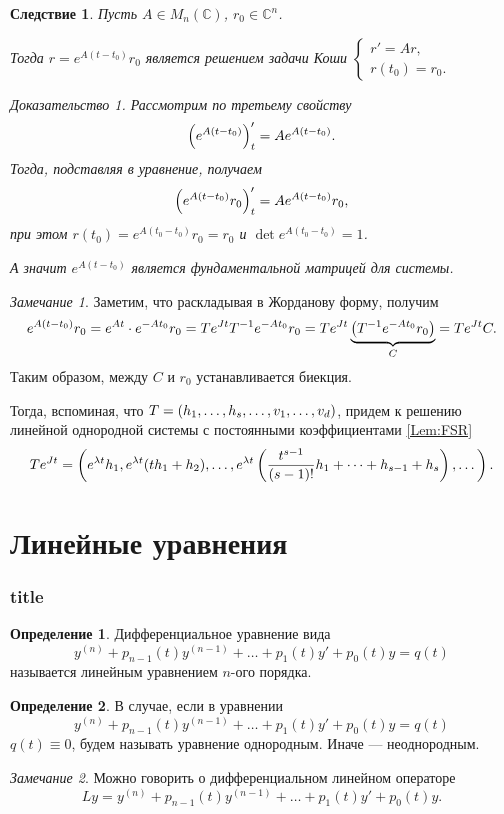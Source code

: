 \documentclass[a5paper, 10pt]{article}
\theoremstyle{definition}
\newtheorem{Def}{Определение}
\theoremstyle{plain}
\newtheorem{Cor}{Следствие}
\theoremstyle{remark}
\newtheorem*{Note}{Замечание}
\newtheorem*{Proof}{Доказательство}
\begin{document}
		\begin{Cor}
			Пусть $A \in M_n (\mathbb{C})$, $r_0 \in \mathbb{C}^n$. 
			
			Тогда $r= e^{A(t-t_0)} r_0$ является решением задачи Коши $\begin{cases}r'=Ar,\\ r(t_0) = r_0.\end{cases}$
			
			\begin{Proof}
				Рассмотрим по третьему свойству
				\[
				\left(e^{A(t-t_0)}\right)_t' = A e^{A(t-t_0)}.
				\]
				Тогда, подставляя в уравнение, получаем
				\[
				\left(e^{A(t-t_0)}r_0\right)_t' = A e^{A(t-t_0)}r_0,
				\]
				при этом $r(t_0) = e^{A(t_0-t_0)} r_0 = r_0$ и $\det e^{A(t_0-t_0)} = 1$.
				
				А значит $e^{A(t-t_0)}$ является фундаментальной матрицей для системы.
			\end{Proof}
		\end{Cor}
	
		\begin{Note}
			Заметим, что раскладывая в Жорданову форму, получим
			\[
			e^{A(t-t_0)}r_0 = e^{At}\cdot e^{-At_0}r_0 = T e^{Jt} T^{-1} e^{-At_0}r_0 = T e^{Jt} \underbrace{\left(T^{-1} e^{-At_0}r_0\right)}_{C} = Te^{Jt} C.
			\]
			Таким образом, между $C$ и $r_0$ устанавливается биекция.
			
			Тогда, вспоминая, что $T = \left(h_1, \dots, h_s, \dots, v_1, \dots, v_d\right)$, придем к решению линейной однородной системы с постоянными коэффициентами \ref{Lem:FSR}
			\[
			Te^{Jt} = \left(e^{\lambda t}h_1, e^{\lambda t} (th_1+h_2), \dots, e^{\lambda t} \left(\frac{t^{s-1}}{(s-1)!} h_1 + \dots + h_{s-1} + h_s\right), \dots\right).
			\]
		\end{Note}
	
		\part{Линейные уравнения}
		\section{title}
		\begin{Def}
			Дифференциальное уравнение вида 
			\[
			y^{(n)} + p_{n-1}(t) y^{(n-1)} + \dots + p_1(t) y' + p_0(t) y = q(t)
			\]
			называется линейным уравнением $n$-ого порядка.
		\end{Def}
		\begin{Def}
			В случае, если в уравнении \[
			y^{(n)} + p_{n-1}(t) y^{(n-1)} + \dots + p_1(t) y' + p_0(t) y = q(t)
			\]
			$q(t) \equiv 0$, будем называть уравнение однородным. Иначе --- неоднородным.
		\end{Def}
		\begin{Note}
			Можно говорить о дифференциальном линейном операторе 
			\[
			Ly = y^{(n)} + p_{n-1}(t) y^{(n-1)} + \dots + p_1(t) y' + p_0(t) y.
			\]
		\end{Note}
	
\end{document}
